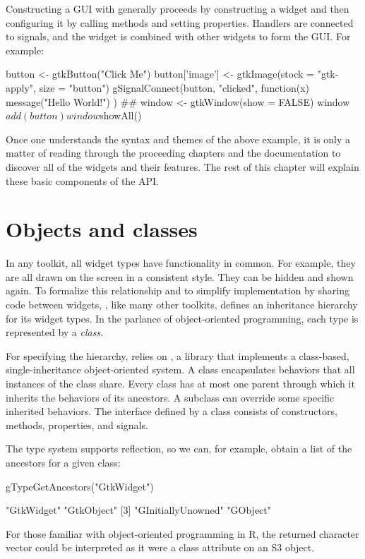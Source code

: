 Constructing a GUI with  generally proceeds by constructing
a widget and then configuring it by calling methods and setting
properties. Handlers are connected to signals, and the widget is
combined with other widgets to form the GUI. For example:
\begin{Schunk}
\begin{Sinput}
 button <- gtkButton("Click Me")
 button['image'] <- gtkImage(stock = "gtk-apply", 
                             size = "button")
 gSignalConnect(button, "clicked", function(x) {
   message("Hello World!")
 })
 ##
 window <- gtkWindow(show = FALSE)
 window$add(button)
 window$showAll()
\end{Sinput}
\end{Schunk}
% 
Once one understands the syntax and themes of the above example, it is
only a matter of reading through the proceeding chapters and the
documentation to discover all of the widgets and their features. The
rest of this chapter will explain these basic components of the API.

\section{Objects and classes}

In any toolkit, all widget types have functionality in common. For
example, they are all drawn on the screen in a consistent style. They
can be hidden and shown again. To formalize this relationship and to
simplify implementation by sharing code between widgets, ,
like many other toolkits, defines an inheritance hierarchy for its
widget types. In the parlance of object-oriented programming, each
type is represented by a \textit{class}.

For specifying the hierarchy,  relies on , a
 library that implements a class-based, single-inheritance
object-oriented system. A  class encapsulates behaviors
that all instances of the class share. Every class has at most one
parent through which it inherits the behaviors of its ancestors. A
subclass can override some specific inherited behaviors. The interface
defined by a class consists of constructors, methods, properties,
and signals. 

The type system supports reflection, so we can, for example, obtain a
list of the ancestors for a given class:
\begin{Schunk}
\begin{Sinput}
 gTypeGetAncestors("GtkWidget")
\end{Sinput}
\begin{Soutput}
[1] "GtkWidget"         "GtkObject"        
[3] "GInitiallyUnowned" "GObject"          
\end{Soutput}
\end{Schunk}
%
For those familiar with object-oriented programming in R, the returned
character vector could be interpreted as it were a class attribute on
an S3 object.

